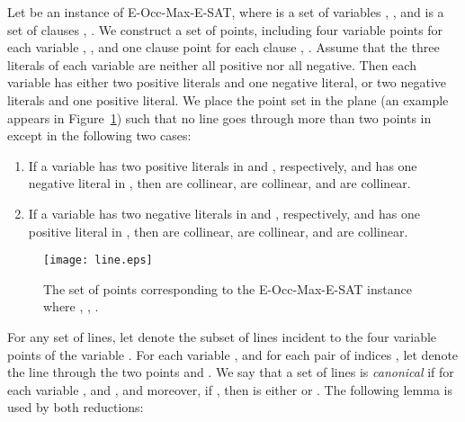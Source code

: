 \documentclass[letterpaper,11pt]{article}
\begin{document}
Let  be an instance of {\sc E-Occ-Max-E-SAT},
where  is a set of  variables , ,
and  is a set of  clauses , .
We construct a set  of  points,
including four variable points 
for each variable , ,
and one clause point  for each clause , .
Assume that the three literals of each variable
are neither all positive nor all negative.
Then each variable has either two positive literals and one negative literal,
or two negative literals and one positive literal.
We place the point set  in the plane 
(an example appears in Figure~\ref{fig:line})
such that no line goes through more than two points in 
except in the following two cases:
\begin{enumerate} \itemsep -1pt
\item
If a variable  has two positive literals in  and ,
respectively,
and has one negative literal in ,
then  are collinear,
 are collinear,
and  are collinear.
\item
If a variable  has two negative literals in  and ,
respectively,
and has one positive literal in ,
then  are collinear,
 are collinear,
and  are collinear.
\end{enumerate}

\begin{figure}[htb]
\centering\texttt{[image: line.eps]}
\caption{The set  of  points
corresponding to the {\sc E-Occ-Max-E-SAT} instance  where
,
,
.}
\label{fig:line}
\end{figure}


For any set  of lines,
let  denote the subset of lines
incident to the four variable points 
of the variable .
For each variable ,
and for each pair of indices ,
let  denote the line through the two points  and .
We say that a set  of lines is \emph{canonical} if for each variable ,
 and
,
and moreover,
if , then  is
either 
or .
The following lemma is used by both reductions:
\end{document}
